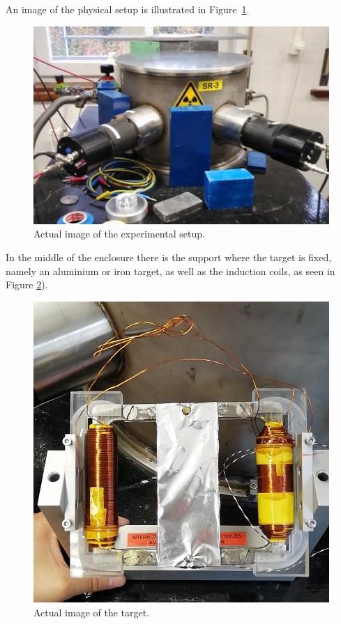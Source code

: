 \documentclass[10pt,swedish, openany]{book}
\begin{document}
An image of the physical setup is illustrated in Figure~\ref{fig:setupexp}.

\begin{figure}[h]
\includegraphics[scale=0.8]{experimentalsetup.jpg}
\centering
\caption{Actual image of the experimental setup.}
\label{fig:setupexp}
\end{figure}

In the middle of the enclosure there is the support where the target is fixed, namely an aluminium or iron target, as well as the induction coils, as seen in Figure \ref{fig:cible}).

\begin{figure}[H]
\includegraphics[scale=0.3]{cible.jpeg}
\centering
\caption{Actual image of the target.}
\label{fig:cible}
\end{figure}
\end{document}
